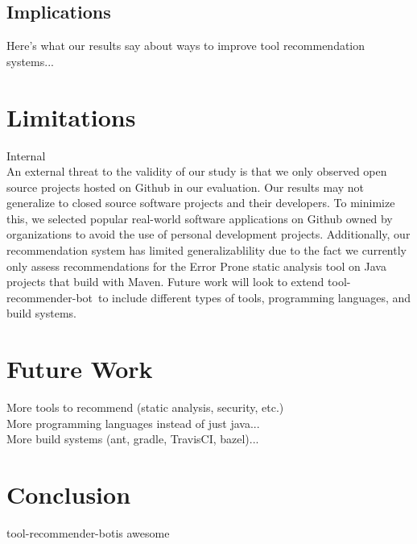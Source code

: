 \documentclass[conference]{IEEEtran}
\newcommand{\tool}{tool-recommender-bot}
\begin{document}
\subsection{Implications}

Here's what our results say about ways to improve tool recommendation systems...

\section{Limitations}

Internal\\

An external threat to the validity of our study is that we only observed open source projects hosted on Github in our evaluation. Our results may not generalize to closed source software projects and their developers. To minimize this, we selected popular real-world software applications on Github owned by organizations to avoid the use of personal development projects. Additionally, our recommendation system has limited generalizablility due to the fact we currently only assess recommendations for the Error Prone static analysis tool on Java projects that build with Maven. Future work will look to extend \tool~to include different types of tools, programming languages, and build systems.

\section{Future Work}

More tools to recommend (static analysis, security, etc.) \\

More programming languages instead of just java...\\

More build systems (ant, gradle, TravisCI, bazel)...\\

\section{Conclusion}

\tool is awesome




  
%

\end{document}
